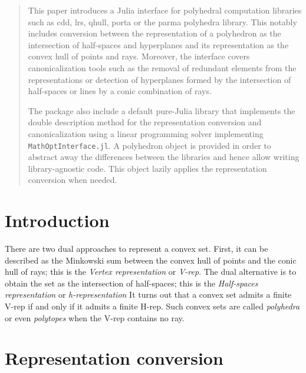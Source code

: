 \documentclass{juliacon}
\newcommand{\Vrep}{V-rep}
\newcommand{\hrep}{H-rep}
\newcommand{\jlpkg}[1]{\texttt{#1.jl}}
\begin{document}


\maketitle

\begin{abstract}

    This paper introduces a Julia interface for polyhedral computation libraries such as cdd, lrs, qhull, porta or the parma polyhedra library.
    This notably includes conversion between the representation of a polyhedron as the intersection of half-spaces and hyperplanes and
    its representation as the convex hull of points and rays.
    Moreover, the interface covers canonicalization tools such as the removal of redundant elements from the representations or
    detection of hyperplanes formed by the intersection of half-spaces or lines by a conic combination of rays.

    The package also include a default pure-Julia library that implements the double description method for the representation conversion
    and canonicalization using a linear programming solver implementing \jlpkg{MathOptInterface}.
    A polyhedron object is provided in order to abstract away the differences between the libraries and hence allow writing library-agnostic code.
    This object lazily applies the representation conversion when needed.

\end{abstract}

\section{Introduction}

There are two dual approaches to represent a convex set.
First, it can be described as the Minkowski sum between the convex hull of points
and the conic hull of rays; this is the \emph{Vertex representation} or \emph{\Vrep{}}.
The dual alternative is to obtain the set as the intersection of half-spaces;
this is the \emph{Half-spaces representation} or \emph{h-representation}
It turns out that a convex set admits a finite \Vrep{} if and only if it admits a finite \hrep{}.
Such convex sets are called \emph{polyhedra} or even \emph{polytopes} when the \Vrep{} contains no ray.

\section{Representation conversion}
\end{document}
